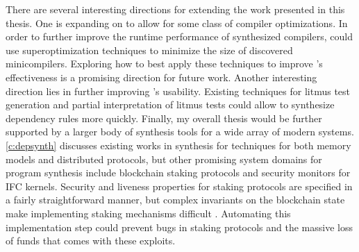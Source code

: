 There are several interesting directions for extending the work presented in this thesis.
One is expanding on \jitsynth
to allow for some class of compiler optimizations.
In order to further improve the runtime performance of synthesized compilers,
\jitsynth could use superoptimization techniques to minimize the size
of discovered minicompilers.
Exploring how to best apply these techniques to improve \jitsynth's effectiveness
is a promising direction for future work.
Another interesting direction lies in further improving \depsynth's usability.
Existing techniques for litmus test generation and partial interpretation of litmus tests
\cite{mohan:crashmonkey,bornholt:memsynth}
could allow \depsynth to synthesize dependency rules more quickly.
Finally, my overall thesis would be further supported by a larger
body of synthesis tools for a wide array of modern systems.
\cref{c:depsynth} discusses existing works in synthesis for
techniques for both memory models and distributed protocols,
but other promising system domains for program synthesis %
include blockchain staking protocols and security monitors for IFC kernels.
Security and liveness properties for staking protocols are specified in a fairly straightforward manner,
but complex invariants on the blockchain state make implementing staking mechanisms difficult
\cite{fahad:pos,wenting:secure-pos,aggelos:verified-pos}.
Automating this implementation step could prevent bugs in staking protocols
and the massive loss of funds that comes with these exploits.
